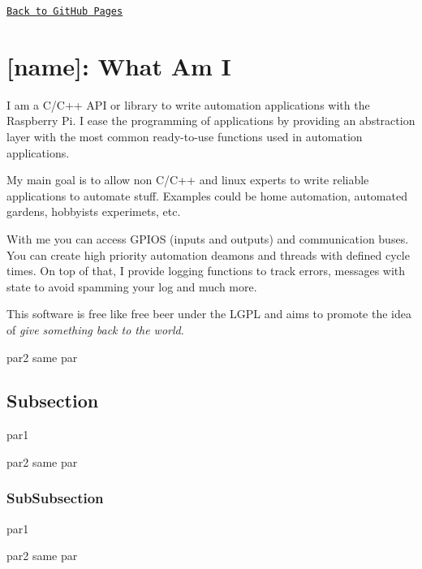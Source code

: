 \href{https://pettitpeon.github.io/rpiapi/}{\tt Back to Git\+Hub Pages}~\newline
 \hypertarget{invstDoku_title}{}\section{\mbox{[}name\mbox{]}\+: What Am I       }\label{invstDoku_title}
I am a C/\+C++ A\+PI or library to write automation applications with the Raspberry Pi. I ease the programming of applications by providing an abstraction layer with the most common ready-\/to-\/use functions used in automation applications.

My main goal is to allow non C/\+C++ and linux experts to write reliable applications to automate stuff. Examples could be home automation, automated gardens, hobbyists\textquotesingle{} experimets, etc.

With me you can access G\+P\+I\+OS (inputs and outputs) and communication buses. You can create high priority automation deamons and threads with defined cycle times. On top of that, I provide logging functions to track errors, messages with state to avoid spamming your log and much more.

This software is free like free beer under the L\+G\+PL and aims to promote the idea of {\itshape give something back to the world}.

par2 same par\hypertarget{invstDoku_sub1}{}\subsection{Subsection       }\label{invstDoku_sub1}
par1

par2 same par\hypertarget{invstDoku_subsub1}{}\subsubsection{Sub\+Subsection}\label{invstDoku_subsub1}
par1

par2 same par 